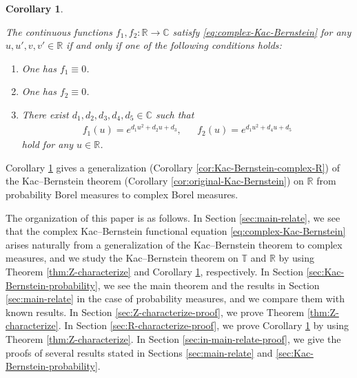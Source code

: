 \documentclass[12pt]{article}
\newtheorem{corollary}[theorem]{Corollary}
\theoremstyle{definition}
\theoremstyle{remark}
\numberwithin{equation}{section}
\numberwithin{figure}{section}
\numberwithin{table}{section}
\begin{document}
\begin{corollary}
  \label{cor:R-characterize}

The continuous functions $ f_1 , f_2 \colon \mathbb{ R } \to \mathbb{ C } $ satisfy \eqref{eq:complex-Kac-Bernstein} for any $ u , u' , v , v' \in \mathbb{ R } $ if and only if one of the following conditions holds:

\begin{enumerate}
  \item \label{item:R-characterize-f1-zero}
  
  One has $ f_1 \equiv 0 $.

  \item \label{item:R-characterize-f2-zero}
  
  One has $ f_2 \equiv 0 $.

\item \label{item:R-characterize-Gauss}

There exist $ d_1 , d_2 , d_3 , d_4 , d_5 \in \mathbb{ C } $ such that
\begin{align}
  f_1 ( u )
  = e^{ d_1 u^2 + d_2 u + d_3 }, & &
  f_2 ( u )
  = e^{ d_1 u^2 + d_4 u + d_5 } \label{eq:R-characterize-Gauss-equation}
\end{align}
hold for any $ u \in \mathbb{ R } $.

\end{enumerate}

\end{corollary}

Corollary \ref{cor:R-characterize} gives a generalization (Corollary \ref{cor:Kac-Bernstein-complex-R}) of the Kac--Bernstein theorem (Corollary \ref{cor:original-Kac-Bernstein}) on $ \mathbb{ R } $ from probability Borel measures to complex Borel measures.

The organization of this paper is as follows.
In Section \ref{sec:main-relate}, we see that the complex Kac--Bernstein functional equation \eqref{eq:complex-Kac-Bernstein} arises naturally from a generalization of the Kac--Bernstein theorem to complex measures, and we study the Kac--Bernstein theorem on $ \mathbb{ T } $ and $ \mathbb{ R } $ by using Theorem \ref{thm:Z-characterize} and Corollary \ref{cor:R-characterize}, respectively.
In Section \ref{sec:Kac-Bernstein-probability}, we see the main theorem and the results in Section \ref{sec:main-relate} in the case of probability measures, and we compare them with known results.
In Section \ref{sec:Z-characterize-proof}, we prove Theorem \ref{thm:Z-characterize}.
In Section \ref{sec:R-characterize-proof}, we prove Corollary \ref{cor:R-characterize} by using Theorem \ref{thm:Z-characterize}.
In Section \ref{sec:in-main-relate-proof}, we give the proofs of several results stated in Sections \ref{sec:main-relate} and \ref{sec:Kac-Bernstein-probability}.
\end{document}

